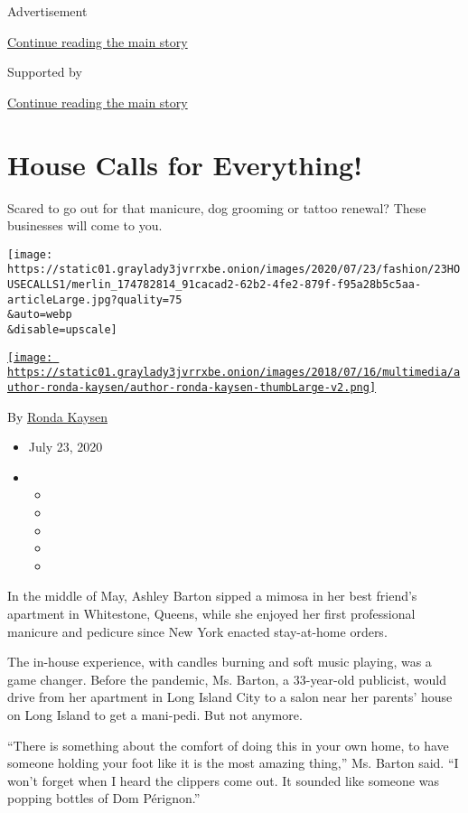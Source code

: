 Advertisement

\protect\hyperlink{after-top}{Continue reading the main story}

Supported by

\protect\hyperlink{after-sponsor}{Continue reading the main story}

\hypertarget{house-calls-for-everything}{%
\section{House Calls for Everything!}\label{house-calls-for-everything}}

Scared to go out for that manicure, dog grooming or tattoo renewal?
These businesses will come to you.

\texttt{[image: https://static01.graylady3jvrrxbe.onion/images/2020/07/23/fashion/23HOUSECALLS1/merlin\_174782814\_91cacad2-62b2-4fe2-879f-f95a28b5c5aa-articleLarge.jpg?quality=75\\\&auto=webp\\\&disable=upscale]}

\href{https://www.nytimes3xbfgragh.onion/by/ronda-kaysen}{\texttt{[image: https://static01.graylady3jvrrxbe.onion/images/2018/07/16/multimedia/author-ronda-kaysen/author-ronda-kaysen-thumbLarge-v2.png]}}

By \href{https://www.nytimes3xbfgragh.onion/by/ronda-kaysen}{Ronda
Kaysen}

\begin{itemize}
\item
  July 23, 2020
\item
  \begin{itemize}
  \item
  \item
  \item
  \item
  \item
  \end{itemize}
\end{itemize}

In the middle of May, Ashley Barton sipped a mimosa in her best friend's
apartment in Whitestone, Queens, while she enjoyed her first
professional manicure and pedicure since New York enacted stay-at-home
orders.

The in-house experience, with candles burning and soft music playing,
was a game changer. Before the pandemic, Ms. Barton, a 33-year-old
publicist, would drive from her apartment in Long Island City to a salon
near her parents' house on Long Island to get a mani-pedi. But not
anymore.

``There is something about the comfort of doing this in your own home,
to have someone holding your foot like it is the most amazing thing,''
Ms. Barton said. ``I won't forget when I heard the clippers come out. It
sounded like someone was popping bottles of Dom Pérignon.''

